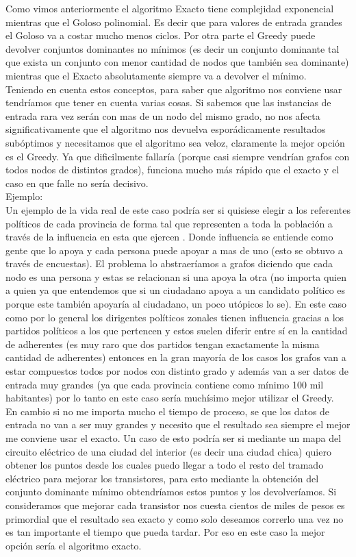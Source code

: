 Como vimos anteriormente el algoritmo Exacto tiene complejidad exponencial mientras que el Goloso polinomial. Es decir que para valores de entrada grandes el Goloso va a costar mucho menos ciclos. Por otra parte el Greedy puede devolver conjuntos dominantes no mínimos (es decir un conjunto dominante tal que exista un conjunto con menor cantidad de nodos que también sea dominante) mientras que el Exacto absolutamente siempre va a devolver el mínimo. \\
Teniendo en cuenta estos conceptos, para saber que algoritmo nos conviene usar tendríamos que tener en cuenta varias cosas. Si sabemos que las instancias de entrada rara vez serán con mas de un nodo del mismo grado, no nos afecta significativamente que el algoritmo nos devuelva esporádicamente resultados subóptimos y necesitamos que el algoritmo sea veloz, claramente la mejor opción es el Greedy. Ya que dificilmente fallaría (porque casi siempre vendrían grafos con todos nodos de distintos grados), funciona mucho más rápido que el exacto y el caso en que falle no sería decisivo. \\
Ejemplo:\\
Un ejemplo de la vida real de este caso podría ser si quisiese elegir a los referentes políticos de cada provincia de forma tal que representen a toda la población a través de la influencia en esta que ejercen . Donde influencia se entiende como gente que lo apoya y cada persona puede apoyar a mas de uno (esto se obtuvo a través de encuestas). El problema lo abstraeríamos a grafos diciendo que cada nodo es una persona y estas se relacionan si una apoya la otra (no importa quien a quien ya que entendemos que si un ciudadano apoya a un candidato político es porque este también apoyaría al ciudadano, un poco utópicos lo se). En este caso como por lo general los dirigentes políticos zonales tienen influencia gracias a los partidos políticos a los que pertencen y estos suelen diferir entre sí en la cantidad de adherentes (es muy raro que dos partidos tengan exactamente la misma cantidad de adherentes) entonces en la gran mayoría de los casos los grafos van a estar compuestos todos por nodos con distinto grado y además van a ser datos de entrada muy grandes (ya que cada provincia contiene como mínimo 100 mil habitantes) por lo tanto en este caso sería muchísimo mejor utilizar el Greedy. \\
En cambio si no me importa mucho el tiempo de proceso, se que los datos de entrada no van a ser muy grandes y necesito que el resultado sea siempre el mejor me conviene usar el exacto. Un caso de esto podría ser si mediante un mapa del circuito eléctrico de una ciudad del interior (es decir una ciudad chica) quiero obtener los puntos desde los cuales puedo llegar a todo el resto del tramado eléctrico para mejorar los transistores, para esto mediante la obtención del conjunto dominante mínimo obtendríamos estos puntos y los devolveríamos. Si consideramos que mejorar cada transistor nos cuesta cientos de miles de pesos es primordial que el resultado sea exacto y como solo deseamos correrlo una vez no es tan importante el tiempo que pueda tardar. Por eso en este caso la mejor opción sería el algoritmo exacto. \\

